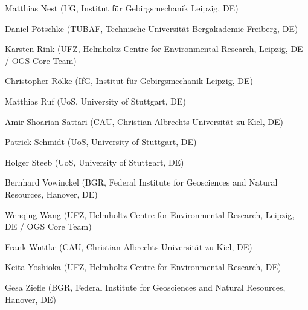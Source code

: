 \begin{list}{-}{\leftmargin=1em \itemindent=0em \itemsep=0.1em}
\item Matthias Nest (IfG, Institut für Gebirgsmechanik Leipzig, DE)	
\item Daniel P\"otschke (TUBAF, Technische Universit\"at Bergakademie Freiberg, DE)
\item Karsten Rink (UFZ, Helmholtz Centre for Environmental Research, Leipzig, DE / OGS Core Team) 
\item Christopher Rölke (IfG, Institut für Gebirgsmechanik Leipzig, DE)	
\item Matthias Ruf (UoS, University of Stuttgart, DE)
\item Amir Shoarian Sattari (CAU, Christian-Albrechts-Universität zu Kiel, DE)
\item Patrick Schmidt (UoS, University of Stuttgart, DE)	
\item Holger Steeb (UoS, University of Stuttgart, DE)	
\item Bernhard Vowinckel (BGR, Federal Institute for Geosciences and Natural Resources, Hanover, DE)	\item Wenqing Wang (UFZ, Helmholtz Centre for Environmental Research, Leipzig, DE / OGS Core Team) \item Frank Wuttke (CAU, Christian-Albrechts-Universität zu Kiel, DE)	
\item Keita Yoshioka (UFZ, Helmholtz Centre for Environmental Research, DE) 
\item Gesa Ziefle (BGR, Federal Institute for Geosciences and Natural Resources, Hanover, DE)	
\end{list}